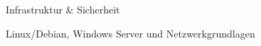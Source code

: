 \begin{cventries}
  \zcventry
    {Infrastruktur \& Sicherheit} %
    {
      \begin{cvitems} %
        \item {Linux/Debian, Windows Server und Netzwerkgrundlagen}
      \end{cvitems}
    }

\end{cventries}

